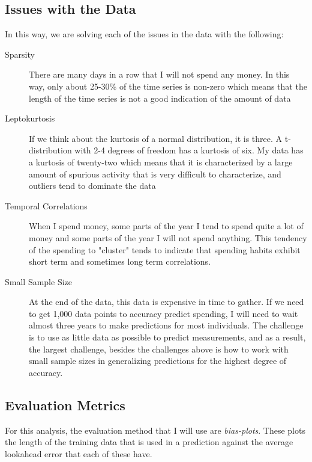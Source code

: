 \documentclass[11pt,a4paper]{article}
\newcommand{\bplots}{\textit{bias-plots}\xspace}
\begin{document}
\subsection{Issues with the Data}
In this way, we are solving each of the issues in the data with the following:
\begin{description}
	\item[Sparsity] There are many days in a row that I will not spend any money. In this way, only about 25-30\% of the time series is non-zero which means that the length of the time series is not a good indication of the amount of data
	\item[Leptokurtosis] If we think about the kurtosis of a normal distribution, it is three. A t-distribution with 2-4 degrees of freedom has a kurtosis of six. My data has a kurtosis of twenty-two which means that it is characterized by a large amount of spurious activity that is very difficult to characterize, and outliers tend to dominate the data
	\item[Temporal Correlations] When I spend money, some parts of the year I tend to spend quite a lot of money and some parts of the year I will not spend anything. This tendency of the spending to "cluster" tends to indicate that spending habits exhibit short term and sometimes long term correlations. 
	\item[Small Sample Size] At the end of the data, this data is expensive in time to gather. If we need to get 1,000 data points to accuracy predict spending, I will need to wait almost three years to make predictions for most individuals. The challenge is to use as little data as possible to predict measurements, and as a result, the largest challenge, besides the challenges above is how to work with small sample sizes in generalizing predictions for the highest degree of accuracy. 
\end{description}

\subsection{Evaluation Metrics}
For this analysis, the evaluation method that I will use are \bplots. These plots the length of the training data that is used in a prediction against the average lookahead error that each of these have. 
\end{document}
